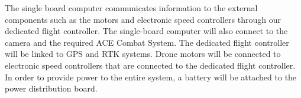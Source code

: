 
The single board computer communicates information to the external components such as the motors and electronic speed controllers through our dedicated flight controller. The single-board computer will also connect to the camera and the required ACE Combat System. The dedicated flight controller will be linked to GPS and RTK systems. Drone motors will be connected to electronic speed controllers that are connected to the dedicated flight controller. In order to provide power to the entire system, a battery will be attached to the power distribution board.